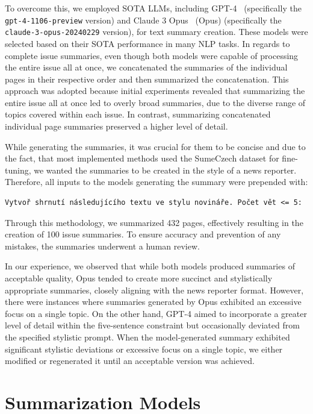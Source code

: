 \documentclass[english, ba, kiv, he, iso690numb, pdf, viewonly]{fasthesis}
\begin{document}
To overcome this, we employed SOTA LLMs, including GPT-4~\cite{openai2024gpt4} (specifically the \texttt{gpt-4-1106-preview} version) and Claude 3 Opus~\cite{anthropic-2024} (Opus) (specifically the \texttt{claude-3-opus-20240229} version), for text summary creation. These models were selected based on their SOTA performance in many NLP tasks. In regards to complete issue summaries, even though both models were capable of processing the entire issue all at once, we concatenated the summaries of the individual pages in their respective order and then summarized the concatenation. This approach was adopted because initial experiments revealed that summarizing the entire issue all at once led to overly broad summaries, due to the diverse range of topics covered within each issue. In contrast, summarizing concatenated individual page summaries preserved a higher level of detail.

While generating the summaries, it was crucial for them to be concise and due to the fact, that most implemented methods used the SumeCzech dataset for fine-tuning, we wanted the summaries to be created in the style of a news reporter. Therefore, all inputs to the models generating the summary were prepended with:
\lstset{style=plainsrc, numbers=none, breaklines=true, 	breakatwhitespace=True,}
\begin{lstlisting}
Vytvoř shrnutí následujícího textu ve stylu novináře. Počet vět <= 5:
\end{lstlisting}
Through this methodology, we summarized 432 pages, effectively resulting in the creation of 100 issue summaries. To ensure accuracy and prevention of any mistakes, the summaries underwent a human review. 

In our experience, we observed that while both models produced summaries of acceptable quality, Opus tended to create more succinct and stylistically appropriate summaries, closely aligning with the news reporter format. However, there were instances where summaries generated by Opus exhibited an excessive focus on a single topic. On the other hand, GPT-4 aimed to incorporate a greater level of detail within the five-sentence constraint but occasionally deviated from the specified stylistic prompt. 
When the model-generated summary exhibited significant stylistic deviations or excessive focus on a single topic, we either modified or regenerated it until an acceptable version was achieved.

\section{Summarization Models}
\end{document}
